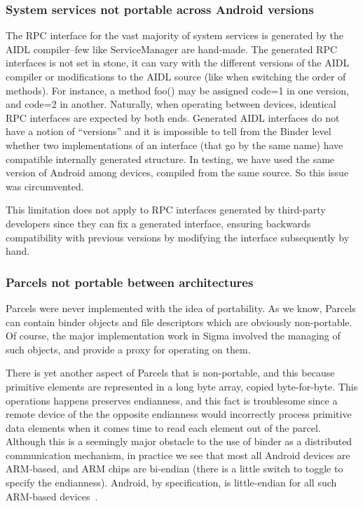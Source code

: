 \documentclass[prodmode]{acmlarge}
\begin{document}
\subsubsection{System services not portable across Android versions}
The RPC interface for the vast majority of system services is generated by the AIDL compiler--few like ServiceManager are hand-made. The generated RPC interfaces is not set in stone, it can vary with the different versions of the AIDL compiler or modifications to the AIDL source (like when switching the order of methods). For instance, a method foo() may be assigned code=1 in one version, and code=2 in another. Naturally, when operating between devices, identical RPC interfaces are expected by both ends. Generated AIDL interfaces do not have a notion of ``versions'' and it is impossible to tell from the Binder level whether two implementations of an interface (that go by the same name) have compatible internally generated structure. In testing, we have used the same version of Android among devices, compiled from the same source. So this issue was circumvented.

This limitation does not apply to RPC interfaces generated by third-party developers since they can fix a generated interface, ensuring backwards compatibility with previous versions by modifying the interface subsequently by hand.

\subsubsection{Parcels not portable between architectures}
Parcels were never implemented with the idea of portability. As we know, Parcels can contain binder objects and file descriptors which are obviously non-portable. Of course, the major implementation work in Sigma involved the managing of such objects, and provide a proxy for operating on them.

There is yet another aspect of Parcels that is non-portable, and this because primitive elements are represented in a long byte array, copied byte-for-byte. This operations happens preserves endianness, and this fact is troublesome since a remote device of the the opposite endianness would incorrectly process primitive data elements when it comes time to read each element out of the parcel. Although this is a seemingly major obstacle to the use of binder as a distributed communication mechanism, in practice we see that most all Android devices are ARM-based, and ARM chips are bi-endian (there is a little switch to toggle to specify the endianness). Android, by specification, is little-endian for all such ARM-based devices~\cite{ARMLittleEndian}.
\end{document}
